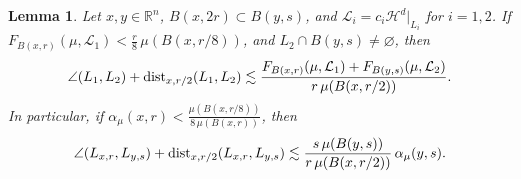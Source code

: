 \documentclass[11pt]{amsart}
\newcommand{\HH}{{\mathcal H}}
\newcommand{\LL}{{\mathcal L}}
\newcommand{\dist}{{\rm dist}}
\newtheorem{lemma}[theorem]{Lemma}
\theoremstyle{definition}
\theoremstyle{remark}
\numberwithin{equation}{section}
\def\lec{\lesssim}
\def\lec{\lesssim}
\newcommand{\hdis}[1]{{\mbox{\dist}}_{#1}}
\begin{document}


\begin{lemma}\label{l:angle-general}
	Let $x,y\in \mathbb{R}^{n}$, $B(x,2r)\subset B(y,s)$, and $\LL_{i}= c_{i}\HH^{d}|_{L_{i}}$ for $i=1,2$.
	If  $F_{B(x,r)}(\mu,\LL_{1})< \frac r8\,\mu(B(x,r/8))$, and $L_2\cap B(y,s)\neq\varnothing$, then
		\begin{equation}\label{e:angle-general1}
	\angle(L_1,L_2)+	\hdis{x,r/2}(L_1,L_2)\lec \frac{ F_{B(x,r)}(\mu,\LL_{1}) + F_{B(y,s)}(\mu,\LL_{2})}{{ r\,\mu(B(x,r/2))}}.
	\end{equation}
	 In particular, if $\alpha_{\mu}(x,r)<\frac{\mu(B(x,r/8))}{8\,\mu(B(x,r))}$, then
	\begin{equation}\label{e:angle-general}
	\angle(L_{x,r},L_{y,s})+ \dist_{x,r/2}(L_{x,r},L_{y,s})\lec \frac{s\,\mu(B(y,s))}{{ r\,\mu(B(x,r/2))}}\, \alpha_{\mu}(y,s).
	\end{equation}
\end{lemma}
\end{document}
